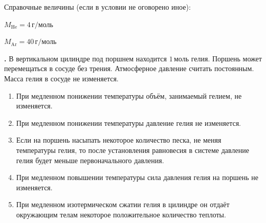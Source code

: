 \documentclass[12pt,a4paper]{article}
\newif\ifShowSolutions
\newcounter{banktask}
\newcommand{\BankTask}[3]{%
  \refstepcounter{banktask}%
  \Needspace{35mm}\par\medskip\noindent\begin{minipage}{\linewidth}%
  \noindent\textbf{\thebanktask.}\quad #2\par
  \ifShowSolutions
    #3\par
    \ifdefined\TutorEdition
      \ifcsname TutorSource#1\endcsname
        \smallskip{\small\csname TutorSource#1\endcsname\par}%
      \fi
    \fi
  \fi
  \end{minipage}\par\medskip
}
\begin{document}
Справочные величины (если в условии не оговорено иное):\par
$M_{\mathrm{He}}=4\,\text{г}/\text{моль}$\par
$M_{\mathrm{Ar}}=40\,\text{г}/\text{моль}$



\BankTask{c17D9F}{
В вертикальном цилиндре под поршнем находится \(1\,\text{моль}\) гелия. Поршень может перемещаться в сосуде без трения. Атмосферное давление считать постоянным. Масса гелия в сосуде не изменяется.
\begin{enumerate}
\item При медленном понижении температуры объём, занимаемый гелием, не изменяется.
\item При медленном понижении температуры давление гелия не изменяется.
\item Если на поршень насыпать некоторое количество песка, не меняя температуры гелия, то после установления равновесия в системе давление гелия будет меньше первоначального давления.
\item При медленном повышении температуры сила давления гелия на поршень не изменяется.
\item При медленном изотермическом сжатии гелия в цилиндре он отдаёт окружающим телам некоторое положительное количество теплоты.
\end{enumerate}
}{
\smallskip\noindent\textbf{Решение от GPT}\par
В равновесии \(p=p_{\text{атм}}+Mg/S\), где \(M\) — масса поршня с нагрузкой, \(S\) — площадь поршня.
\begin{enumerate}
\item Неверно: при постоянной нагрузке \(p=\mathrm{const}\), поэтому из \(pV=\nu RT\) следует, что при охлаждении объём уменьшается.
\item Верно: давление определяется неизменной нагрузкой и атмосферным давлением.
\item Неверно: добавление песка увеличивает \(M\), поэтому давление возрастает.
\item Верно: сила давления \(F=pS\) постоянна.
\item Верно: при изотермическом сжатии \(\Delta U=0\), работа газа \(A<0\); следовательно, \(Q=\Delta U+A<0\), газ отдаёт теплоту.
\end{enumerate}
Ответ: \(245\).
}
\end{document}
